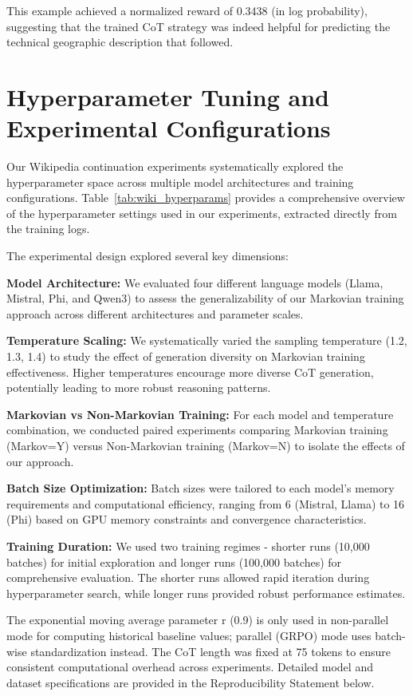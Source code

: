 \documentclass{article} %
\begin{document}
This example achieved a normalized reward of 0.3438 (in log probability), suggesting that the trained CoT strategy was indeed helpful for predicting the technical geographic description that followed.

\section{Hyperparameter Tuning and Experimental Configurations}
\label{sec:hyperparameters}

Our Wikipedia continuation experiments systematically explored the hyperparameter space across multiple model architectures and training configurations. Table~\ref{tab:wiki_hyperparams} provides a comprehensive overview of the hyperparameter settings used in our experiments, extracted directly from the training logs.

The experimental design explored several key dimensions:

\textbf{Model Architecture:} We evaluated four different language models (Llama, Mistral, Phi, and Qwen3) to assess the generalizability of our Markovian training approach across different architectures and parameter scales. 

\textbf{Temperature Scaling:} We systematically varied the sampling temperature (1.2, 1.3, 1.4) to study the effect of generation diversity on Markovian training effectiveness. Higher temperatures encourage more diverse CoT generation, potentially leading to more robust reasoning patterns.

\textbf{Markovian vs Non-Markovian Training:} For each model and temperature combination, we conducted paired experiments comparing Markovian training (Markov=Y) versus Non-Markovian training (Markov=N) to isolate the effects of our approach.

\textbf{Batch Size Optimization:} Batch sizes were tailored to each model's memory requirements and computational efficiency, ranging from 6 (Mistral, Llama) to 16 (Phi) based on GPU memory constraints and convergence characteristics.

\textbf{Training Duration:} We used two training regimes - shorter runs (10,000 batches) for initial exploration and longer runs (100,000 batches) for comprehensive evaluation. The shorter runs allowed rapid iteration during hyperparameter search, while longer runs provided robust performance estimates.

The exponential moving average parameter r (0.9) is only used in non-parallel mode for computing historical baseline values; parallel (GRPO) mode uses batch-wise standardization instead. The CoT length was fixed at 75 tokens to ensure consistent computational overhead across experiments. Detailed model and dataset specifications are provided in the Reproducibility Statement below.
\end{document}
